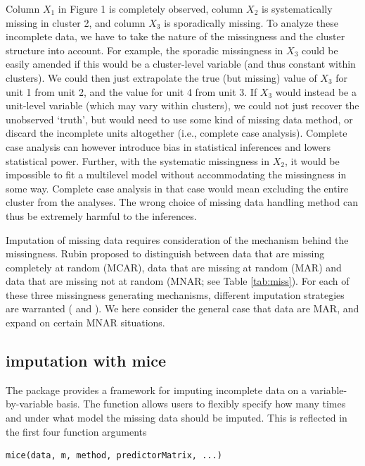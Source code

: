 \documentclass[
  article]{jss}
\newcommand{\fct}[1]{\code{#1()}}
\begin{document}
Column \(X_1\) in Figure 1 is completely observed, column \(X_2\) is
systematically missing in cluster 2, and column \(X_3\) is sporadically
missing. To analyze these incomplete data, we have to take the nature of
the missingness and the cluster structure into account. For example, the
sporadic missingness in \(X_3\) could be easily amended if this would be
a cluster-level variable (and thus constant within clusters). We could
then just extrapolate the true (but missing) value of \(X_3\) for unit 1
from unit 2, and the value for unit 4 from unit 3. If \(X_3\) would
instead be a unit-level variable (which may vary within clusters), we
could not just recover the unobserved `truth', but would need to use
some kind of missing data method, or discard the incomplete units
altogether (i.e., complete case analysis). Complete case analysis can
however introduce bias in statistical inferences and lowers statistical
power. Further, with the systematic missingness in \(X_2\), it would be
impossible to fit a multilevel model without accommodating the
missingness in some way. Complete case analysis in that case would mean
excluding the entire cluster from the analyses. The wrong choice of
missing data handling method can thus be extremely harmful to the
inferences.

Imputation of missing data requires consideration of the mechanism
behind the missingness. Rubin proposed to distinguish between data that
are missing completely at random (MCAR), data that are missing at random
(MAR) and data that are missing not at random (MNAR; see Table
\ref{tab:miss}). For each of these three missingness generating
mechanisms, different imputation strategies are warranted
(\citet{yuce08} and \citet{hox15}). We here consider the general case
that data are MAR, and expand on certain MNAR situations.

\hypertarget{imputation-with-mice}{%
\subsection{imputation with mice}\label{imputation-with-mice}}

The  package  provides a framework for imputing
incomplete data on a variable-by-variable basis. The \fct{mice} function
allows users to flexibly specify how many times and under what model the
missing data should be imputed. This is reflected in the first four
function arguments

\begin{verbatim}
mice(data, m, method, predictorMatrix, ...)
\end{verbatim}
\end{document}
